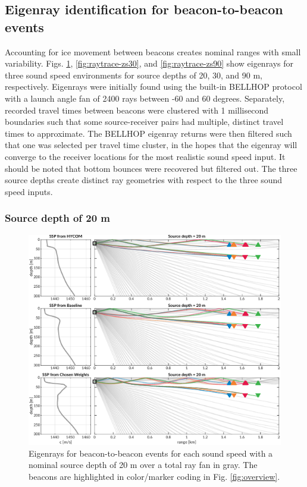 \subsection{Eigenray identification for beacon-to-beacon events} \label{sec:eigenrays} 

Accounting for ice movement between beacons creates nominal ranges with small variability.
Figs. \ref{fig:raytrace-zs20}, \ref{fig:raytrace-zs30}, and \ref{fig:raytrace-zs90} show eigenrays for three sound speed environments for source depths of 20, 30, and 90 m, respectively.
Eigenrays were initially found using the built-in BELLHOP protocol with a launch angle fan of 2400 rays between -60 and 60 degrees.
Separately, recorded travel times between beacons were clustered with 1 millisecond boundaries such that some source-receiver pairs had multiple, distinct travel times to approximate.
The BELLHOP eigenray returns were then filtered such that one was selected per travel time cluster, in the hopes that the eigenray will converge to the receiver locations for the most realistic sound speed input. 
It should be noted that bottom bounces were recovered but filtered out.
The three source depths create distinct ray geometries with respect to the three sound speed inputs.

\subsubsection{Source depth of 20 m}
\begin{figure}[ht!]
  \centering
  \includegraphics[width=\columnwidth]{figs/raytrace-3env-zs-20.pdf}
  \caption{Eigenrays for beacon-to-beacon events for each sound speed with a nominal source depth of 20 m over a total ray fan in gray. The beacons are highlighted in color/marker coding in Fig. \ref{fig:overview}.}
  \label{fig:raytrace-zs20}
\end{figure}

